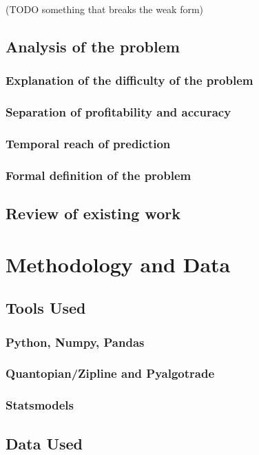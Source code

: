 \documentclass[a4paper,11pt]{article}
\begin{document}
(TODO something that breaks the weak form)

\subsection{Analysis of the problem}
\subsubsection{Explanation of the difficulty of the problem}
\subsubsection{Separation of profitability and accuracy}
\subsubsection{Temporal reach of prediction}
\subsubsection{Formal definition of the problem}

\subsection{Review of existing work}

\section{Methodology and Data}
\subsection{Tools Used}
\subsubsection{Python, Numpy, Pandas}
\subsubsection{Quantopian/Zipline and Pyalgotrade}
\subsubsection{Statsmodels}

\subsection{Data Used}
\end{document}
